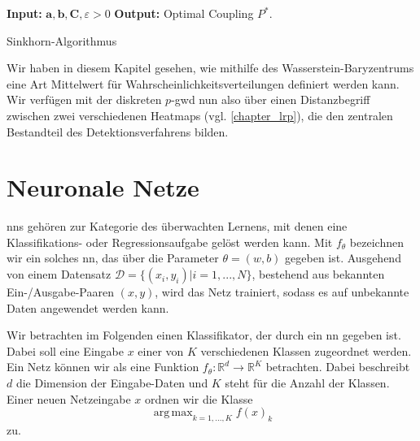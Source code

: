 \documentclass[twoside, 12pt,a4paper]{book}
\DeclareMathOperator*{\argmax}{arg\,max}
\numberwithin{equation}{section}
\begin{document}
	
	
	

	
	
	
	
	\begin{algorithm}
		\hspace*{\algorithmicindent} \textbf{Input: } $\boldsymbol{a}, \boldsymbol{b}, \boldsymbol{C}, \varepsilon > 0$		\newline
		\hspace*{\algorithmicindent} \textbf{Output: } Optimal Coupling $P^*$. 
		
		\caption{Sinkhorn-Algorithmus}
		\label{alg:sinkhorn}
		\begin{algorithmic}
			\REPEAT
		\end{algorithmic}	
	\end{algorithm}
	
	\noindent Wir haben in diesem Kapitel gesehen, wie mithilfe des Wasserstein-Bary\-zen\-trums eine Art Mittelwert für Wahrscheinlichkeitsverteilungen definiert werden kann.\\
	
	\noindent Wir verfügen mit der diskreten $p$-\ac{gwd} nun also über einen Distanzbegriff zwischen zwei verschiedenen Heatmaps (vgl. \autoref{chapter_lrp}), die den zentralen Bestandteil des Detektionsverfahrens bilden. 
	

	\section{Neuronale Netze} \label{chapter_nn}
	\acfp{nn} gehören zur Kategorie des überwachten Lernens, mit denen eine Klas\-si\-fi\-ka\-tions- oder Regressionsaufgabe gelöst werden kann. Mit $f_\theta$ bezeichnen wir ein solches \ac{nn}, das über die Parameter $\theta = (w,b)$ gegeben ist.
	Ausgehend von einem Datensatz $\mathcal{D} = \lbrace (x_i,y_i)| i = 1, ..., N \rbrace$, bestehend aus bekannten Ein-/Ausgabe-Paaren $(x,y)$, wird das Netz trainiert, sodass es auf unbekannte Daten angewendet werden kann.
	
	\noindent Wir betrachten im Folgenden einen Klassifikator, der durch ein \ac{nn} gegeben ist. Dabei soll eine Eingabe $x$ einer von $K$ verschiedenen Klassen zugeordnet werden. Ein Netz können wir als eine Funktion $f_\theta : \mathbb{R}^d \to \mathbb{R}^K$ betrachten. Dabei beschreibt $d$ die Dimension der Eingabe-Daten und $K$ steht für die Anzahl der Klassen.
	Einer neuen Netzeingabe $x$ ordnen wir die Klasse \begin{equation}
		\argmax_{k=1,...,K}f(x)_k
	\end{equation} 
	zu.
	
\end{document}
